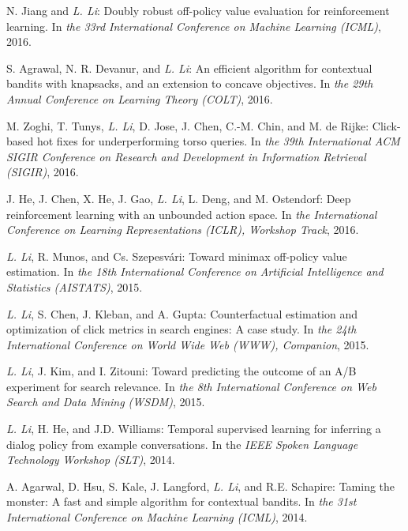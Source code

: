 \documentclass[10pt,twoside,letterpaper]{article}
\newcommand{\selffont}[1]{{\textit{#1}}}
\newcommand{\venuefont}[1]{{\textit{#1}}}
\newcommand{\myself}{\selffont{L. Li}}
\begin{document}
\begin{compactenum}[(C1)]
\item{N. Jiang and \myself: Doubly robust off-policy value evaluation for reinforcement learning.  In \venuefont{the 33rd International Conference on Machine Learning (ICML)}, 2016.}

\item{S. Agrawal, N. R. Devanur, and \myself: An efficient algorithm for contextual bandits with knapsacks, and an extension to concave objectives.  In \venuefont{the 29th Annual Conference on Learning Theory (COLT)}, 2016.}

\item{M. Zoghi, T. Tunys, \myself, D. Jose, J. Chen, C.-M. Chin, and M. de Rijke: Click-based hot fixes for underperforming torso queries.  In \venuefont{the 39th International ACM SIGIR Conference on Research and Development in Information Retrieval (SIGIR)}, 2016.}

\item{J. He, J. Chen, X. He, J. Gao, \myself, L. Deng, and M. Ostendorf: Deep reinforcement learning with an unbounded action space.  In \venuefont{the International Conference on Learning Representations (ICLR), Workshop Track}, 2016.}

\item{\myself, R. Munos, and Cs. Szepesv\'{a}ri: Toward minimax off-policy value estimation.  In \venuefont{the 18th International Conference on Artificial Intelligence and Statistics (AISTATS)}, 2015.}

\item{\myself, S. Chen, J. Kleban, and A. Gupta: Counterfactual estimation and optimization of click metrics in search engines: A case study.  In \venuefont{the 24th International Conference on World Wide Web (WWW), Companion}, 2015.}

\item{\myself, J. Kim, and I. Zitouni: Toward predicting the outcome of an {A/B} experiment for search relevance.  In \venuefont{the 8th International Conference on Web Search and Data Mining (WSDM)}, 2015.}

\item{\myself, H. He, and J.D. Williams: Temporal supervised learning for inferring a dialog policy from example conversations.  In the \venuefont{IEEE Spoken Language Technology Workshop (SLT)}, 2014.}

\item{A. Agarwal, D. Hsu, S. Kale, J. Langford, \myself, and R.E. Schapire: Taming the monster: A fast and simple algorithm for contextual bandits.  In \venuefont{the 31st International Conference on Machine Learning (ICML)}, 2014.}


\end{compactenum}
\end{document}
